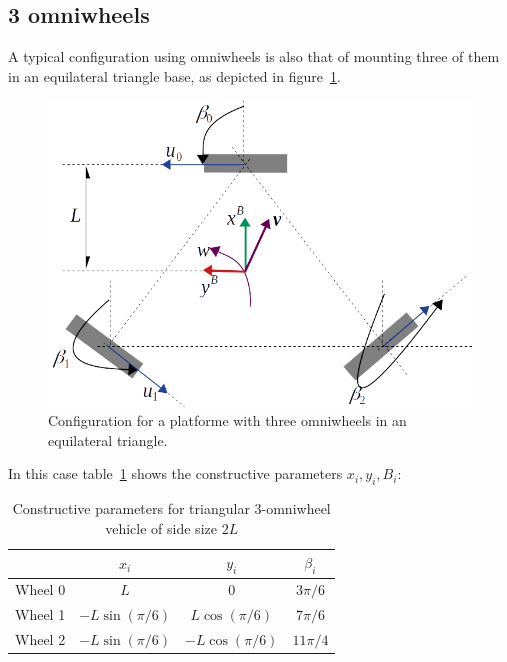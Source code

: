 \subsection{3 omniwheels}
A typical configuration using omniwheels is also that of mounting three of them in an equilateral triangle base, as depicted in figure~\ref{fig:three_omniwheels_kinematics}.
\begin{figure}[bth!]
  \begin{center}
    \includegraphics[width=1.0\columnwidth]{figures/three_omniwheels_kinematics.png}
    \caption{Configuration for a platforme with three omniwheels in an equilateral triangle.}
    \label{fig:three_omniwheels_kinematics}
  \end{center}
\end{figure}

In this case table~\ref{tab:params_3_omni} shows the constructive parameters  $x_i,y_i,B_i$: 
\begin{table}[hbt] \centering
\caption{Constructive parameters for triangular 3-omniwheel vehicle of side size $2L$}
\begin{tabular}
[c]{|c|c|c|c|}\hline
		& $x_i$ 		    & $y_i$				& $\beta_i$ \\\hline
Wheel 0 & $L$ 		        & $0$				& $3\pi/6$ \\\hline
Wheel 1 & $-L\sin(\pi/6)$   & $L\cos(\pi/6)$	& $7\pi/6$ \\\hline
Wheel 2 & $-L\sin(\pi/6)$ 	& $-L\cos(\pi/6)$	& $11\pi/4$ \\\hline
\end{tabular}
\label{tab:params_3_omni}
\end{table}

